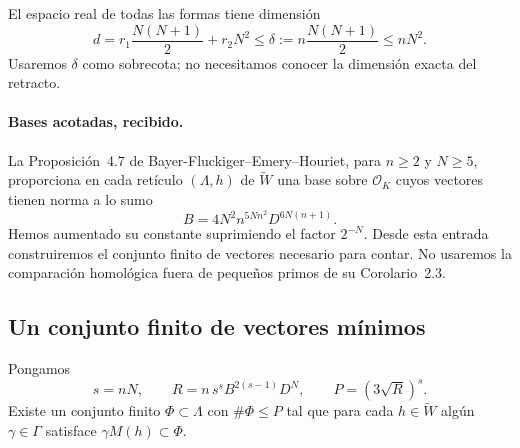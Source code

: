 El espacio real de todas las formas tiene dimensión
\begin{equation}
 d=r_1\frac{N(N+1)}2+r_2N^2
 \le \delta:=n\frac{N(N+1)}2\le nN^2.
 \label{eq:ti-dimension}
\end{equation}
Usaremos $\delta$ como sobrecota; no necesitamos conocer
la dimensión exacta del retracto.

\paragraph{Bases acotadas, recibido.}
La Proposición~4.7 de Bayer-Fluckiger--Emery--Houriet,
para $n\ge2$ y $N\ge5$, proporciona en cada retículo
$(\Lambda,h)$ de $\widetilde W$ una base sobre
$\mathcal O_K$ cuyos vectores tienen norma a lo sumo
\begin{equation}
 B=4N^2 n^{5Nn^2}D^{6N(n+1)}.
 \label{eq:ti-base-acotada}
\end{equation}
Hemos aumentado su constante suprimiendo el factor $2^{-N}$.
Desde esta entrada construiremos el conjunto finito de vectores
necesario para contar. No usaremos la comparación homológica
fuera de pequeños primos de su Corolario~2.3.

\subsection{Un conjunto finito de vectores mínimos}

\begin{proposicion}
\label{prop:ti-phi}
Pongamos
\begin{equation}
 s=nN,\qquad
 R=n\,s^s B^{2(s-1)}D^N,\qquad
 P=(3\sqrt R)^s.
 \label{eq:ti-R-P}
\end{equation}
Existe un conjunto finito $\Phi\subset\Lambda$ con
$\#\Phi\le P$ tal que para cada $h\in\widetilde W$ algún
$\gamma\in\Gamma$ satisface $\gamma M(h)\subset\Phi$.
\end{proposicion}

